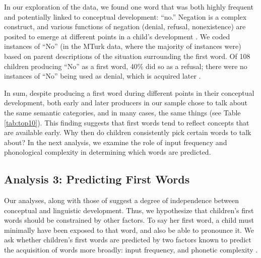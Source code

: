 \documentclass[10pt,letterpaper]{article}
\begin{document}
In our exploration of the data, we found one word that was both highly frequent and potentially linked to conceptual development: ``no.'' Negation is a complex construct, and various functions of negation (denial, refusal, nonexistence) are posited to emerge at different points in a child's development \cite{pea1982}. We coded instances of ``No'' (in the MTurk data, where the majority of instances were) based on parent descriptions of the situation surrounding the first word. Of 108 children producing ``No'' as a first word, 40\% did so as a refusal; there were no instances of ``No'' being used as denial, which is acquired later \cite{pea1982}. 

In sum, despite producing a first word during different points in their conceptual development, both early and later producers in our sample chose to talk about the same semantic categories, and in many cases, the same things (see Table \ref{tab:top10}). This finding suggests that first words tend to reflect concepts that are available early. Why then do children consistently pick certain words to talk about? In the next analysis, we examine the role of input frequency and phonological complexity in determining which words are predicted. 

\subsection{Analysis 3: Predicting First Words}

Our analyses, along with those of  suggest a degree of independence between conceptual and linguistic development. Thus, we hypothesize that children's first words should be constrained by other factors. To say her first word, a child must minimally have been exposed to that word, and also be able to pronounce it. We ask whether children's first words are predicted by two factors known to predict the acquisition of words more broadly: input frequency, and phonetic complexity \cite{morgan1996,goodman2008}.

\end{document}
